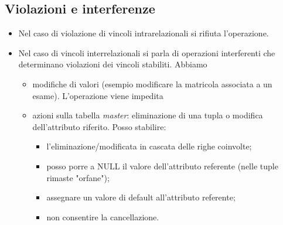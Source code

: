 \subsection{Violazioni e interferenze}
\begin{itemize}
	\item Nel caso di violazione di vincoli intrarelazionali si rifiuta l'operazione.
	\item Nel caso di vincoli interrelazionali si parla di operazioni interferenti che determinano violazioni dei vincoli stabiliti. Abbiamo
	\begin{itemize}
		\item modifiche di valori (esempio modificare la matricola associata a un esame). L'operazione viene impedita
		\item azioni sulla tabella \emph{master}: eliminazione di una tupla o modifica dell'attributo riferito. Posso stabilire:
		\begin{itemize}
			\item l'eliminazione/modificata in cascata delle righe coinvolte;
			\item posso porre a NULL il valore dell'attributo referente (nelle tuple rimaste "orfane");
			\item assegnare un valore di default all'attributo referente;
			\item non consentire la cancellazione.
		\end{itemize}
	\end{itemize}
\end{itemize}